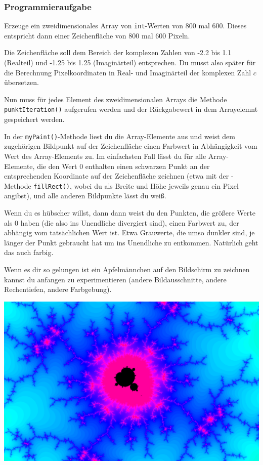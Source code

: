 \subsubsection{Programmieraufgabe}

Erzeuge ein zweidimensionales Array von \lstinline|int|-Werten von 800 mal 600.
Dieses entspricht dann einer Zeichenfläche von 800 mal 600 Pixeln.

Die Zeichenfläche soll dem Bereich der komplexen Zahlen von -2.2 bis 1.1
(Realteil) und -1.25 bis 1.25 (Imaginärteil) entsprechen. Du musst also später
für die Berechnung Pixelkoordinaten in Real- und Imaginärteil der komplexen Zahl
$c$ \glqq übersetzen\grqq .

Nun muss für jedes Element des zweidimensionalen Arrays die Methode
\lstinline|punktIteration()| aufgerufen werden und der Rückgabewert in dem
Arrayelemnt gespeichert werden.

In der \lstinline|myPaint()|-Methode liest du die Array-Elemente aus und weist
dem zugehörigen Bildpunkt auf der Zeichenfläche einen Farbwert in Abhängigkeit
vom Wert des Array-Elements zu. Im einfachsten Fall lässt du für alle
Array-Elemente, die den Wert 0 enthalten einen schwarzen Punkt
an der entsprechenden Koordinate auf der Zeichenfläche zeichnen (etwa mit der
-Methode \lstinline|fillRect()|, wobei du als Breite und Höhe
jeweils genau ein Pixel angibst), und alle anderen Bildpunkte lässt du weiß.

Wenn du es hübscher willst, dann dann weist du den Punkten, die größere Werte
als 0 haben (die also ins Unendliche divergiert sind), einen Farbwert zu, der
abhängig vom tatsächlichen Wert ist. Etwa Grauwerte, die umso dunkler sind, je
länger der Punkt gebraucht hat um ins Unendliche zu entkommen. Natürlich geht
das auch farbig.

Wenn es dir so gelungen ist ein Apfelmännchen auf den Bildschirm zu zeichnen
kannst du anfangen zu experimentieren (andere Bildausschnitte, andere
Rechentiefen, andere Farbgebung).

\includegraphics[width=1.0\textwidth]{./inf/SEKII/18_Java_Arrays/mandelbrot_1.png}

